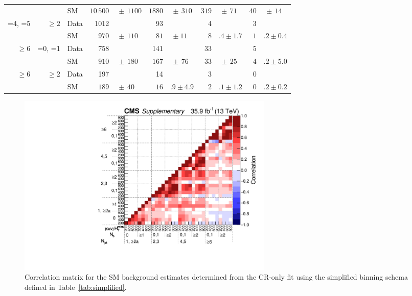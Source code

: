 \begin{table}[!t]
\begin{tabular}{rrlr@{}lr@{}lr@{}lr@{}l}
                   &           & SM   & $10\,500$  & $\,\pm\, 1100$    & $1880$    & $\,\pm\, 310$  & $319$ & $\,\pm\, 71$  & $40$  & $\,\pm\, 14$ \\[0.2ex]
    =4, =5         & ${\geq}2$ & Data & 1012       &                   & 93        &                & 4     &               & 3                    \\
                   &           & SM   & $970$      & $\,\pm\, 110$     & $81$      & $\, \pm 11$    & $8$   & $.4 \pm 1.7$  & $1$   & $.2 \pm 0.4$ \\[0.2ex]
    ${\geq}6$      & =0, =1    & Data & 758        &                   & 141       &                & 33    &               & 5                    \\
                   &           & SM   & $910$      & $\,\pm\, 180$     & $167$     & $\,\pm\, 76$   & $33$  & $\,\pm\, 25$  & $4$   & $.2 \pm 5.0$ \\[0.2ex]
    ${\geq}6$      & ${\geq}2$ & Data & 197        &                   & 14        &                & 3     &               & 0                    \\
                   &           & SM   & $189$      & $\,\pm\, 40$      & $16$      & $.9 \pm 4.9$   & $2$   & $.1 \pm 1.2$  & $0$   & $.2 \pm 0.2$ \\
    \hline
  \end{tabular}
\end{table}
\endgroup

\begin{figure}[!b]
  \centering
  \includegraphics[width=0.6\textwidth]{CMS-SUS-16-038_Figure_005.pdf}
  \caption{Correlation matrix for the SM background estimates
    determined from the CR-only fit using the simplified binning
    schema defined in Table~\ref{tab:simplified}.}
  \label{fig:correlation}
\end{figure} 
